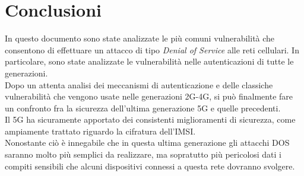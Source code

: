\chapter{Conclusioni}
In questo documento sono state analizzate le più comuni vulnerabilità che consentono di effettuare un 
attacco di tipo \textit{Denial of Service} alle reti cellulari. In particolare, sono state analizzate le vulnerabilità nelle autenticazioni 
di tutte le generazioni.\\
Dopo un attenta analisi dei meccanismi di autenticazione e delle classiche vulnerabilità che vengono usate nelle generazioni 2G-4G, si può finalmente
fare un confronto fra la sicurezza dell'ultima generazione 5G e quelle precedenti.\\
Il 5G ha sicuramente apportato dei consistenti miglioramenti di sicurezza, come ampiamente trattato riguardo la cifratura dell'IMSI.\\
Nonostante ciò è innegabile che in questa ultima generazione gli attacchi DOS saranno molto più semplici da realizzare, ma sopratutto più pericolosi dati
i compiti sensibili che alcuni dispositivi connessi a questa rete dovranno svolgere.